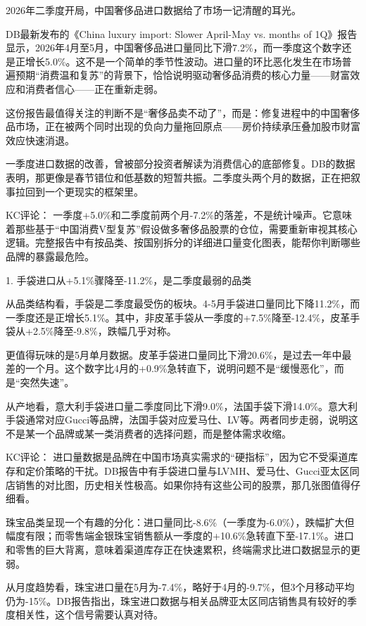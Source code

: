 \documentclass[11pt]{ctexart}
\begin{document}
2026年二季度开局，中国奢侈品进口数据给了市场一记清醒的耳光。

DB最新发布的《China luxury import: Slower April-May vs. months of 1Q》报告显示，2026年4月至5月，中国奢侈品进口量同比下滑7.2\%，而一季度这个数字还是正增长5.0\%。这不是一个简单的季节性波动。进口量的环比恶化发生在市场普遍预期“消费温和复苏”的背景下，恰恰说明驱动奢侈品消费的核心力量——财富效应和消费者信心——正在重新走弱。

这份报告最值得关注的判断不是“奢侈品卖不动了”，而是：修复进程中的中国奢侈品市场，正在被两个同时出现的负向力量拖回原点——房价持续承压叠加股市财富效应快速消退。

一季度进口数据的改善，曾被部分投资者解读为消费信心的底部修复。DB的数据表明，那更像是春节错位和低基数的短暂共振。二季度头两个月的数据，正在把叙事拉回到一个更现实的框架里。

KC评论： 一季度+5.0\%和二季度前两个月-7.2\%的落差，不是统计噪声。它意味着那些基于“中国消费V型复苏”假设做多奢侈品股票的仓位，需要重新审视其核心逻辑。完整报告中有按品类、按国别拆分的详细进口量变化图表，能帮你判断哪些品牌的暴露最危险。

1. 手袋进口从+5.1\%骤降至-11.2\%，是二季度最弱的品类

从品类结构看，手袋是二季度最受伤的板块。4-5月手袋进口量同比下降11.2\%，而一季度还是正增长5.1\%。其中，非皮革手袋从一季度的+7.5\%降至-12.4\%，皮革手袋从+2.5\%降至-9.8\%，跌幅几乎对称。

更值得玩味的是5月单月数据。皮革手袋进口量同比下滑20.6\%，是过去一年中最差的一个月。这个数字比4月的+0.9\%急转直下，说明问题不是“缓慢恶化”，而是“突然失速”。

从产地看，意大利手袋进口量二季度同比下滑9.0\%，法国手袋下滑14.0\%。意大利手袋通常对应Gucci等品牌，法国手袋对应爱马仕、LV等。两者同步走弱，说明这不是某一个品牌或某一类消费者的选择问题，而是整体需求收缩。

KC评论： 进口量数据是品牌在中国市场真实需求的“硬指标”，因为它不受渠道库存和定价策略的干扰。DB报告中有手袋进口量与LVMH、爱马仕、Gucci亚太区同店销售的对比图，历史相关性极高。如果你持有这些公司的股票，那几张图值得仔细看。

珠宝品类呈现一个有趣的分化：进口量同比-8.6\%（一季度为-6.0\%），跌幅扩大但幅度有限；而零售端金银珠宝销售额从一季度的+10.6\%急转直下至-17.1\%。进口和零售的巨大背离，意味着渠道库存正在快速累积，终端需求比进口数据显示的更弱。

从月度趋势看，珠宝进口量在5月为-7.4\%，略好于4月的-9.7\%，但3个月移动平均仍为-15\%。DB报告指出，珠宝进口数据与相关品牌亚太区同店销售具有较好的季度相关性，这个信号需要认真对待。
\end{document}
